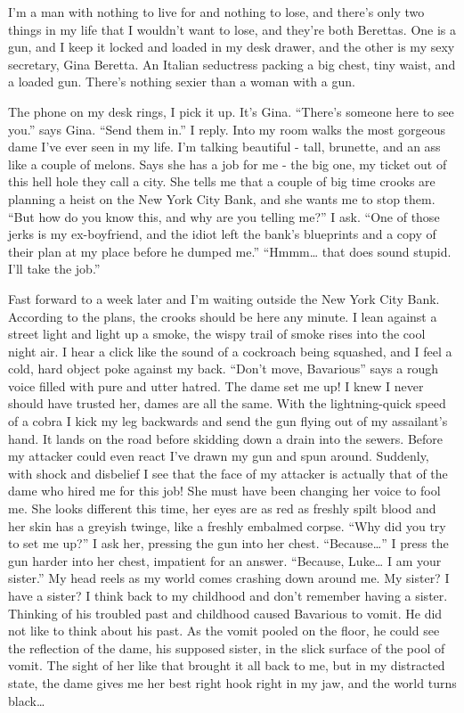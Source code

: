 I'm a man with nothing to live for and nothing to lose, and there's
only two things in my life that I wouldn't want to lose, and
they're both Berettas. One is a gun, and I keep it locked and
loaded in my desk drawer, and the other is my sexy secretary, Gina
Beretta. An Italian seductress packing a big chest, tiny waist, and
a loaded gun. There's nothing sexier than a woman with a gun.



The phone on my desk rings, I pick it up. It's Gina. ``There's
someone here to see you.'' says Gina. ``Send them in.'' I reply. Into
my room walks the most gorgeous dame I've ever seen in my life. I'm
talking beautiful - tall, brunette, and an ass like a couple of
melons. Says she has a job for me - the big one, my ticket out of
this hell hole they call a city. She tells me that a couple of big
time crooks are planning a heist on the New York City Bank, and she
wants me to stop them. ``But how do you know this, and why are you
telling me?'' I ask. ``One of those jerks is my ex-boyfriend, and the
idiot left the bank's blueprints and a copy of their plan at my
place before he dumped me.'' ``Hmmm{\ldots} that does sound stupid. I'll
take the job.''



Fast forward to a week later and I'm waiting outside the New York
City Bank. According to the plans, the crooks should be here any
minute. I lean against a street light and light up a smoke, the
wispy trail of smoke rises into the cool night air. I hear a click
like the sound of a cockroach being squashed, and I feel a cold,
hard object poke against my back. ``Don't move, Bavarious'' says a
rough voice filled with pure and utter hatred. The dame set me up!
I knew I never should have trusted her, dames are all the same.
With the lightning-quick speed of a cobra I kick my leg backwards
and send the gun flying out of my assailant's hand. It lands on the
road before skidding down a drain into the sewers. Before my
attacker could even react I've drawn my gun and spun around.
Suddenly, with shock and disbelief I see that the face of my
attacker is actually that of the dame who hired me for this job!
She must have been changing her voice to fool me. She looks
different this time, her eyes are as red as freshly spilt blood and
her skin has a greyish twinge, like a freshly embalmed corpse. ``Why
did you try to set me up?'' I ask her, pressing the gun into her
chest. ``Because{\ldots}'' I press the gun harder into her chest,
impatient for an answer. ``Because, Luke{\ldots} I am your sister.'' My
head reels as my world comes crashing down around me. My sister? I
have a sister? I think back to my childhood and don't remember
having a sister. Thinking of his troubled past and childhood caused
Bavarious to vomit. He did not like to think about his past. As the
vomit pooled on the floor, he could see the reflection of the dame,
his supposed sister, in the slick surface of the pool of vomit. The
sight of her like that brought it all back to me, but in my
distracted state, the dame gives me her best right hook right in my
jaw, and the world turns black{\ldots} 
 



